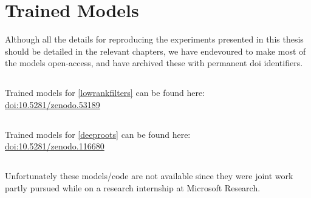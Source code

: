 \documentclass[thesis]{subfiles}
\begin{document}

\chapter{Trained Models}
\label{trainedmodels}
Although all the details for reproducing the experiments presented in this thesis should be detailed in the relevant chapters, we have endevoured to make most of the models open-access, and have archived these with permanent \gls{doi} identifiers.
\section*{}
Trained models for \cref{lowrankfilters} can be found here:\\
\href{https://doi.org/10.5281/zenodo.53189}{doi:10.5281/zenodo.53189}
\section*{}
Trained models for \cref{deeproots} can be found here:\\
\href{https://doi.org/10.5281/zenodo.116680}{doi:10.5281/zenodo.116680}
\section*{}
Unfortunately these models/code are not available since they were joint work partly pursued while on a research internship at Microsoft Research.
\end{document}
